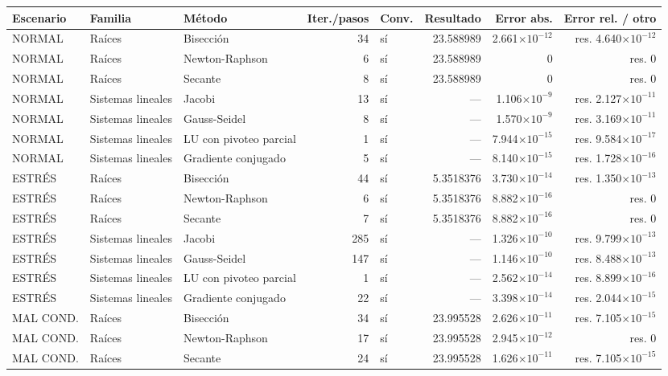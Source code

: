 {\footnotesize
\begin{longtable}{lllrlrrr}
\toprule
\textbf{Escenario} & \textbf{Familia} & \textbf{Método} & \textbf{Iter./pasos} & \textbf{Conv.} & \textbf{Resultado} & \textbf{Error abs.} & \textbf{Error rel. / otro} \\
\midrule
\endhead
NORMAL & Raíces & Bisección & 34 & sí & 23.588989 & 2.661$\times10^{-12}$ & res. 4.640$\times10^{-12}$ \\
NORMAL & Raíces & Newton-Raphson & 6 & sí & 23.588989 & 0 & res. 0 \\
NORMAL & Raíces & Secante & 8 & sí & 23.588989 & 0 & res. 0 \\
NORMAL & Sistemas lineales & Jacobi & 13 & sí & — & 1.106$\times10^{-9}$ & res. 2.127$\times10^{-11}$ \\
NORMAL & Sistemas lineales & Gauss-Seidel & 8 & sí & — & 1.570$\times10^{-9}$ & res. 3.169$\times10^{-11}$ \\
NORMAL & Sistemas lineales & LU con pivoteo parcial & 1 & sí & — & 7.944$\times10^{-15}$ & res. 9.584$\times10^{-17}$ \\
NORMAL & Sistemas lineales & Gradiente conjugado & 5 & sí & — & 8.140$\times10^{-15}$ & res. 1.728$\times10^{-16}$ \\
ESTRÉS & Raíces & Bisección & 44 & sí & 5.3518376 & 3.730$\times10^{-14}$ & res. 1.350$\times10^{-13}$ \\
ESTRÉS & Raíces & Newton-Raphson & 6 & sí & 5.3518376 & 8.882$\times10^{-16}$ & res. 0 \\
ESTRÉS & Raíces & Secante & 7 & sí & 5.3518376 & 8.882$\times10^{-16}$ & res. 0 \\
ESTRÉS & Sistemas lineales & Jacobi & 285 & sí & — & 1.326$\times10^{-10}$ & res. 9.799$\times10^{-13}$ \\
ESTRÉS & Sistemas lineales & Gauss-Seidel & 147 & sí & — & 1.146$\times10^{-10}$ & res. 8.488$\times10^{-13}$ \\
ESTRÉS & Sistemas lineales & LU con pivoteo parcial & 1 & sí & — & 2.562$\times10^{-14}$ & res. 8.899$\times10^{-16}$ \\
ESTRÉS & Sistemas lineales & Gradiente conjugado & 22 & sí & — & 3.398$\times10^{-14}$ & res. 2.044$\times10^{-15}$ \\
MAL COND. & Raíces & Bisección & 34 & sí & 23.995528 & 2.626$\times10^{-11}$ & res. 7.105$\times10^{-15}$ \\
MAL COND. & Raíces & Newton-Raphson & 17 & sí & 23.995528 & 2.945$\times10^{-12}$ & res. 0 \\
MAL COND. & Raíces & Secante & 24 & sí & 23.995528 & 1.626$\times10^{-11}$ & res. 7.105$\times10^{-15}$ \\

\end{longtable}}

